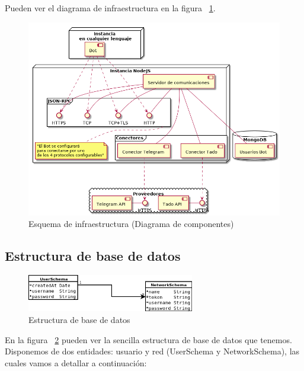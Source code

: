 \documentclass[spanish,12pt, a4paper, twoside]{paper}
\begin{document}
Pueden ver el diagrama de infraestructura en la figura ~\ref{fig:Infraestructura de nodos}.

\begin{figure}
\centering
	\includegraphics[width=\textwidth]{recursos/component}
\caption{Esquema de infraestructura (Diagrama de componentes)}
\label{fig:Infraestructura de nodos}
\end{figure}

\subsection{Estructura de base de datos}

\begin{figure}
\centering
	\includegraphics[width=0.65\textwidth]{recursos/schemes}
\caption{Estructura de base de datos}
\label{fig:Estructura de base de datos}
\end{figure}

En la figura ~\ref{fig:Estructura de base de datos} pueden ver la sencilla estructura de base de datos que tenemos. Disponemos de dos entidades: usuario y red (UserSchema y NetworkSchema), las cuales vamos a detallar a continuación:
\end{document}
